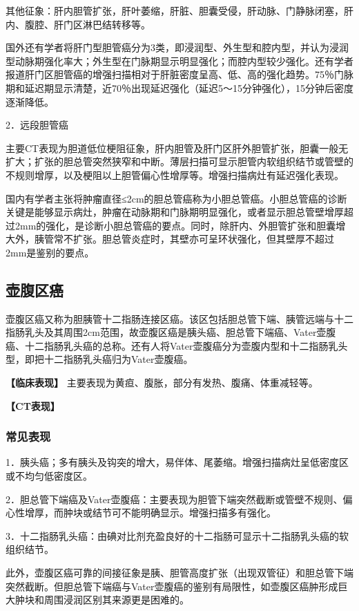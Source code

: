 其他征象：肝内胆管扩张，肝叶萎缩，肝脏、胆囊受侵，肝动脉、门静脉闭塞，肝内、腹腔、肝门区淋巴结转移等。

国外还有学者将肝门型胆管癌分为3类，即浸润型、外生型和腔内型，并认为浸润型动脉期强化率大；外生型在门脉期显示明显强化；而腔内型较少强化。还有学者报道肝门区胆管癌的增强扫描相对于肝脏密度呈高、低、高的强化趋势。75％门脉期和延迟期显示清楚，近70％出现延迟强化（延迟5～15分钟强化），15分钟后密度逐渐降低。

2．远段胆管癌

主要CT表现为胆道低位梗阻征象，肝内胆管及肝门区肝外胆管扩张，胆囊一般无扩大；扩张的胆总管突然狭窄和中断。薄层扫描可显示胆管内软组织结节或管壁的不规则增厚，以及梗阻以上胆管偏心性增厚等。增强扫描病灶有延迟强化表现。

国内有学者主张将肿瘤直径≤2cm的胆总管癌称为小胆总管癌。小胆总管癌的诊断关键是能够显示病灶，肿瘤在动脉期和门脉期明显强化，或者显示胆总管壁增厚超过2mm的强化，是诊断小胆总管癌的要点。同时，除肝内、外胆管扩张和胆囊增大外，胰管常不扩张。胆总管炎症时，其壁亦可呈环状强化，但其壁厚不超过2mm是鉴别的要点。

\subsection{壶腹区癌}

壶腹区癌又称为胆胰管十二指肠连接区癌。该区包括胆总管下端、胰管远端与十二指肠乳头及其周围2cm范围，故壶腹区癌是胰头癌、胆总管下端癌、Vater壶腹癌、十二指肠乳头癌的总称。还有人将Vater壶腹癌分为壶腹内型和十二指肠乳头型，即把十二指肠乳头癌归为Vater壶腹癌。

\textbf{【临床表现】}
主要表现为黄疸、腹胀，部分有发热、腹痛、体重减轻等。

\textbf{【CT表现】}

\subsubsection{常见表现}

1．胰头癌；多有胰头及钩突的增大，易伴体、尾萎缩。增强扫描病灶呈低密度区或不均匀低密度区。

2．胆总管下端癌及Vater壶腹癌：主要表现为胆管下端突然截断或管壁不规则、偏心性增厚，而肿块或结节可不能明确显示。增强扫描多有强化。

3．十二指肠乳头癌：由碘对比剂充盈良好的十二指肠可显示十二指肠乳头癌的软组织结节。

此外，壶腹区癌可靠的间接征象是胰、胆管高度扩张（出现双管征）和胆总管下端突然截断。但胆总管下端癌与Vater壶腹癌的鉴别有局限性，如壶腹区癌肿形成巨大肿块和周围浸润区别其来源更是困难的。

